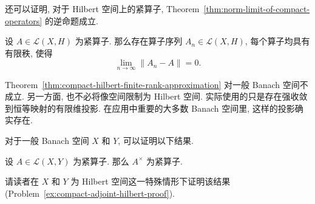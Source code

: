 还可以证明, 对于 Hilbert 空间上的紧算子, Theorem~\ref{thm:norm-limit-of-compact-operators} 的逆命题成立.

\begin{Theorem}
\label{thm:compact-hilbert-finite-rank-approximation}
设 $A\in\mathcal{L}(X,H)$ 为紧算子. 那么存在算子序列 $A_n\in\mathcal{L}(X,H)$, 每个算子均具有有限秩, 使得
\begin{equation}\label{eq:compact-hilbert-finite-rank-approximation-limit}
\lim_{n\to\infty}\|A_n-A\|=0.
\end{equation}

\end{Theorem}

\begingroup
{}
\renewcommand{\endProof}{\par\nobreak\hfill$\blacksquare$\par\vspace{0.1cm}}
\endgroup

\begin{Remark}
\label{rem:finite-rank-approximation-banach-space-caveat}
Theorem~\ref{thm:compact-hilbert-finite-rank-approximation} 对一般 Banach 空间不成立. 另一方面, 也不必将像空间限制为 Hilbert 空间. 实际使用的只是存在强收敛到恒等映射的有限维投影. 在应用中重要的大多数 Banach 空间里, 这样的投影确实存在.
\end{Remark}

对于一般 Banach 空间 $X$ 和 $Y$, 可以证明以下结果.

\begin{Theorem}
\label{thm:compact-operator-adjoint-compact}
设 $A\in\mathcal{L}(X,Y)$ 为紧算子. 那么 $A^\times$ 为紧算子.
\end{Theorem}

请读者在 $X$ 和 $Y$ 为 Hilbert 空间这一特殊情形下证明该结果 (Problem~\ref{ex:compact-adjoint-hilbert-proof}).
